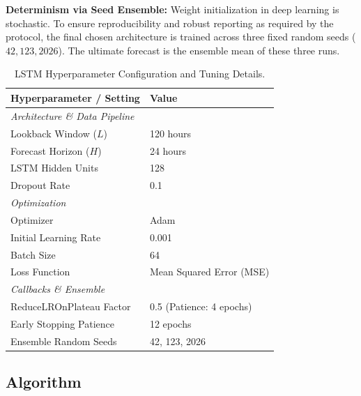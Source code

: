 \documentclass[12pt,a4paper,oneside]{report}
\begin{document}
\textbf{Determinism via Seed Ensemble:} Weight initialization in deep learning is stochastic. To ensure reproducibility and robust reporting as required by the protocol, the final chosen architecture is trained across three fixed random seeds ($42, 123, 2026$). The ultimate forecast is the ensemble mean of these three runs.

\begin{table}[H]
\centering
\caption{LSTM Hyperparameter Configuration and Tuning Details.}
\label{tab:lstm_hyperparams}
\begin{tabular}{ll}
\toprule
\textbf{Hyperparameter / Setting} & \textbf{Value} \\
\midrule
\textit{Architecture \& Data Pipeline} & \\
Lookback Window ($L$) & 120 hours \\
Forecast Horizon ($H$) & 24 hours \\
LSTM Hidden Units & 128 \\
Dropout Rate & 0.1 \\
\midrule
\textit{Optimization} & \\
Optimizer & Adam \\
Initial Learning Rate & 0.001 \\
Batch Size & 64 \\
Loss Function & Mean Squared Error (MSE) \\
\midrule
\textit{Callbacks \& Ensemble} & \\
ReduceLROnPlateau Factor & 0.5 (Patience: 4 epochs) \\
Early Stopping Patience & 12 epochs \\
Ensemble Random Seeds & 42, 123, 2026 \\
\bottomrule
\end{tabular}
\end{table}

\subsection{Algorithm}
\end{document}
